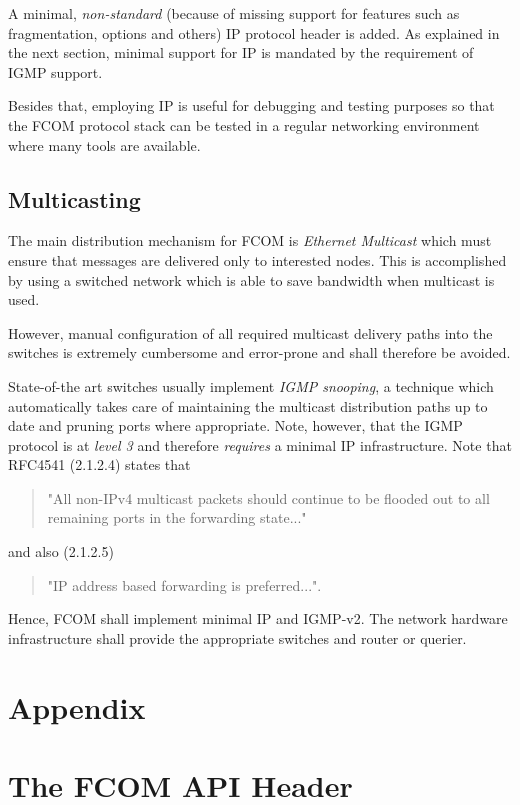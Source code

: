 \documentclass[11pt]{article}
\newcommand{\fcom}{FCOM}
\begin{document}
A minimal, {\em non-standard} (because of missing support for
features such as fragmentation, options and others) IP protocol
header is added. As explained in the next section, minimal support
for IP is mandated by the requirement of IGMP support.

Besides that, employing IP is useful
for debugging and testing purposes so that the \fcom{}
protocol stack can be tested in a regular networking environment
where many tools are available.

\subsection{Multicasting}
The main distribution mechanism for \fcom{} is {\em Ethernet Multicast}
which must ensure that messages are delivered only to interested
nodes. This is accomplished by using a switched network which
is able to save bandwidth when multicast is used.

However,
manual configuration of all required multicast delivery
paths into the switches is extremely cumbersome and error-prone
and shall therefore be avoided.

State-of-the art switches usually implement {\em IGMP snooping},
a technique
which automatically takes care of maintaining the multicast
distribution paths up to date and pruning ports where appropriate.
Note, however, that the IGMP
protocol is at {\em level 3} and therefore {\em requires}
a minimal IP infrastructure. Note that RFC4541 (2.1.2.4) states
that
\begin{quotation}
\noindent
"All non-IPv4 multicast packets should continue to be
flooded out to all remaining ports in the forwarding state..."
\end{quotation}
and also (2.1.2.5)
\begin{quotation}
\noindent
"IP address based forwarding is preferred...".
\end{quotation}

Hence, \fcom{} shall implement minimal IP and IGMP-v2.
The network hardware infrastructure shall provide the
appropriate switches and router or querier.

\appendix
\pagebreak
\section*{Appendix}

\section{The \fcom{} API Header}
\label{app:api}
%
\lstset{basicstyle=\scriptsize, formfeed=\pagebreak}

\end{document}
